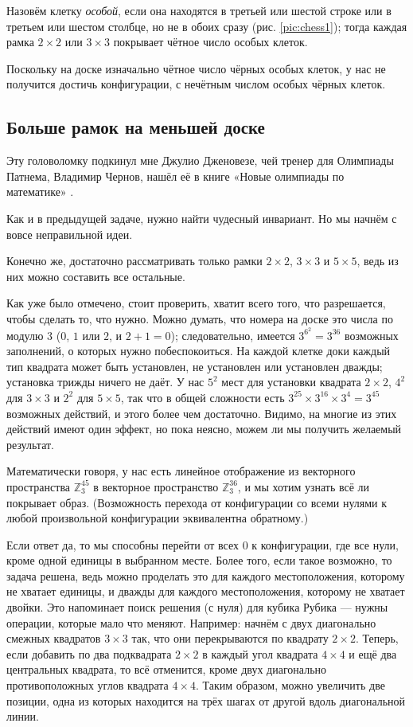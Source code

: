 Назовём клетку \emph{особой}, если она находятся в третьей или шестой строке или в третьем или шестом столбце, но не в обоих сразу (рис. \ref{pic:chess1}); тогда каждая рамка $2 \times 2$ или $3 \times 3$ покрывает чётное число особых клеток.

Поскольку на доске изначально чётное число чёрных особых клеток, у нас не получится достичь конфигурации, с нечётным  числом особых чёрных клеток.

\subsection*{Больше рамок на меньшей доске}

Эту головоломку подкинул мне Джулио Дженовезе, чей тренер для Олимпиады Патнема, Владимир Чернов, нашёл её в книге «Новые олимпиады по математике» \cite{markova}.

Как и в предыдущей задаче, нужно найти чудесный инвариант.
Но мы начнём с вовсе неправильной идеи.

Конечно же, достаточно рассматривать только рамки $2 \times 2$, $3 \times 3$ и $5 \times 5$, ведь из них можно составить все остальные.

Как уже было отмечено, стоит проверить, хватит всего того, что разрешается, чтобы сделать то, что нужно.
Можно думать, что номера на доске это числа по модулю $3$ ($0$, $1$ или $2$, и $2 + 1 = 0$); следовательно, имеется $3^{6^2} = 3^{36}$ возможных заполнений, о которых нужно побеспокоиться.
На каждой клетке доки каждый тип квадрата может быть установлен, не установлен или установлен дважды; установка трижды ничего не даёт.
У нас $5^2$ мест для установки квадрата $2 \times 2$,
$4^2$ для $3 \times 3$
и $2^2$ для $5 \times 5$, так что в общей сложности есть $3^{25} \times 3^{16} \times 3^4 = 3^{45}$ возможных действий, и этого более чем достаточно.
Видимо, на многие из этих действий имеют один эффект, но пока неясно, можем ли мы получить желаемый результат.

Математически говоря, у нас есть линейное отображение из векторного пространства $\mathbb{Z}_3^{45}$ в векторное пространство $\mathbb{Z}_3^{36}$, и мы хотим узнать всё ли покрывает образ.
(Возможность перехода от конфигурации со всеми нулями к любой произвольной конфигурации эквивалентна обратному.)

Если ответ да, то мы способны перейти от всех $0$ к конфигурации, где все нули, кроме одной единицы в выбранном месте.
Более того, если такое возможно, то задача решена, ведь можно проделать это для каждого местоположения, которому не хватает единицы, и дважды для каждого местоположения, которому не хватает двойки.
Это напоминает поиск решения (с нуля) для кубика Рубика --- нужны операции, которые мало что меняют.
Например: начнём с двух диагонально смежных квадратов $3 \times 3$ так, что они перекрываются по квадрату $2 \times 2$.
Теперь, если добавить по два подквадрата $2 \times 2$ в каждый угол квадрата $4 \times 4$ и ещё два центральных квадрата, то всё отменится, кроме двух диагонально противоположных углов квадрата $4 \times 4$.
Таким образом, можно увеличить две позиции, одна из которых находится на трёх шагах от другой вдоль диагональной линии.


